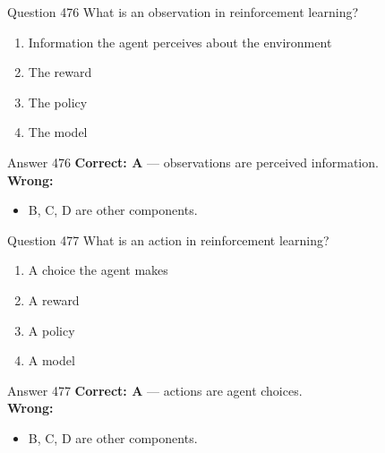 \documentclass[aspectratio=169,11pt]{beamer}
\begin{document}
	\begin{frame}{Question 476}
		What is an observation in reinforcement learning?
		\begin{enumerate}[label=\Alph*.]
			\item Information the agent perceives about the environment
			\item The reward
			\item The policy
			\item The model
		\end{enumerate}
	\end{frame}
	\begin{frame}{Answer 476}
		\textbf{Correct: A} --- observations are perceived information.\\
		\vspace{0.5em}
		\textbf{Wrong:}
		\begin{itemize}
			\item B, C, D are other components.
		\end{itemize}
	\end{frame}
	
	\begin{frame}{Question 477}
		What is an action in reinforcement learning?
		\begin{enumerate}[label=\Alph*.]
			\item A choice the agent makes
			\item A reward
			\item A policy
			\item A model
		\end{enumerate}
	\end{frame}
	\begin{frame}{Answer 477}
		\textbf{Correct: A} --- actions are agent choices.\\
		\vspace{0.5em}
		\textbf{Wrong:}
		\begin{itemize}
			\item B, C, D are other components.
		\end{itemize}
	\end{frame}
	
\end{document}
